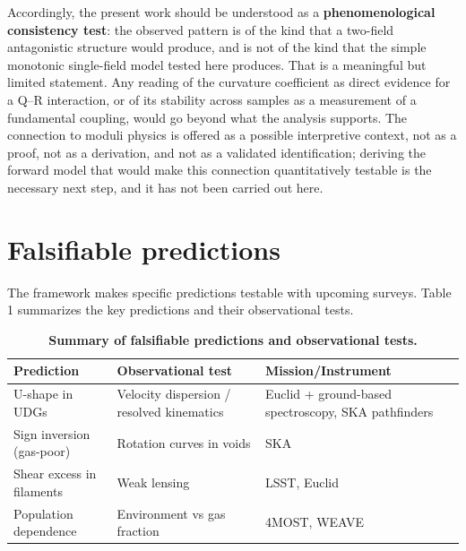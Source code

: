 \documentclass[11pt,a4paper]{article}
\begin{document}
Accordingly, the present work should be understood as a \textbf{phenomenological consistency test}: the observed pattern is of the kind that a two-field antagonistic structure would produce, and is not of the kind that the simple monotonic single-field model tested here produces. That is a meaningful but limited statement. Any reading of the curvature coefficient as direct evidence for a Q--R interaction, or of its stability across samples as a measurement of a fundamental coupling, would go beyond what the analysis supports. The connection to moduli physics is offered as a possible interpretive context, not as a proof, not as a derivation, and not as a validated identification; deriving the forward model that would make this connection quantitatively testable is the necessary next step, and it has not been carried out here.


\section*{Falsifiable predictions}

The framework makes specific predictions testable with upcoming surveys. Table 1 summarizes the key predictions and their observational tests.

\begin{table}[htbp]
\centering
\caption{\textbf{Summary of falsifiable predictions and observational tests.}}
\small
\begin{tabular}{@{}p{}p{}p{}@{}}
\toprule
\textbf{Prediction} & \textbf{Observational test} & \textbf{Mission/Instrument} \\
\midrule
U-shape in UDGs & Velocity dispersion / resolved kinematics & Euclid + ground-based spectroscopy, SKA pathfinders \\
\addlinespace
Sign inversion (gas-poor) & Rotation curves in voids & SKA \\
\addlinespace
Shear excess in filaments & Weak lensing & LSST, Euclid \\
\addlinespace
Population dependence & Environment vs gas fraction & 4MOST, WEAVE \\
\bottomrule
\end{tabular}
\label{tab:predictions}
\end{table}
\end{document}
